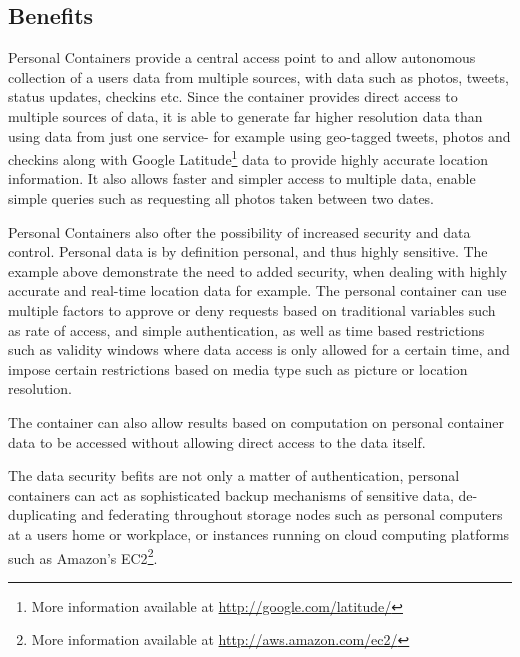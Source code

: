 \documentclass[11pt,a4paper,twoside]{article}
\begin{document}

\subsection{Benefits}

Personal Containers provide a central access point to and allow autonomous collection of a users data from multiple sources, with data such as photos, tweets, status updates, checkins etc. Since the container provides direct access to multiple sources of data, it is able to generate far higher resolution data than using data from just one service- for example using geo-tagged tweets, photos and checkins along with Google Latitude\footnote{More information available at \url{http://google.com/latitude/}} data to provide highly accurate location information. It also allows faster and simpler access to multiple data, enable simple queries such as requesting all photos taken between two dates.

Personal Containers also ofter the possibility of increased security and data control. Personal data is by definition personal, and thus highly sensitive. The example above demonstrate the need to added security, when dealing with highly accurate and real-time location data for example. The personal container can use multiple factors to approve or deny requests based on traditional variables such as rate of access, and simple authentication, as well as time based restrictions such as validity windows where data access is only allowed for a certain time, and impose certain restrictions based on media type such as picture or location resolution.

The container can also allow results based on computation on personal container data to be accessed without allowing direct access to the data itself.

The data security befits are not only a matter of authentication, personal containers can act as sophisticated backup mechanisms of sensitive data, de-duplicating and federating throughout storage nodes such as personal computers at a users home or workplace, or instances running on cloud computing platforms such as Amazon's EC2\footnote{More information available at \url{http://aws.amazon.com/ec2/}}.

\end{document}
